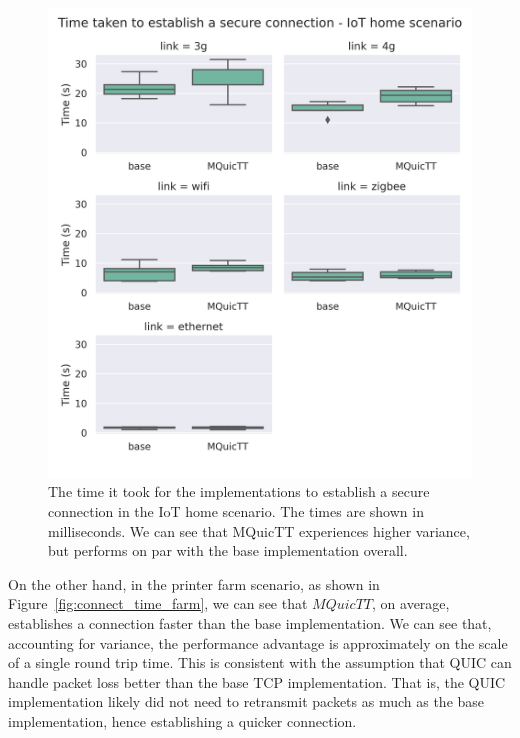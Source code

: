 \begin{figure}
    \centering
    \includegraphics[width=1\linewidth]{images/analysis_connection_time_home.png}
    \caption{The time it took for the implementations to establish a secure connection in the IoT home scenario.
        The times are shown in milliseconds.
        We can see that MQuicTT experiences higher variance, but performs on par with the base implementation overall.}
    \label{fig:connect_time_home}
\end{figure}


On the other hand, in the printer farm scenario, as shown in Figure~\ref{fig:connect_time_farm}, we can see that $MQuicTT$, on average, establishes a connection faster than the base implementation.
We can see that, accounting for variance, the performance advantage is approximately on the scale of a single round trip time.
This is consistent with the assumption that QUIC can handle packet loss better than the base TCP implementation.
That is, the QUIC implementation likely did not need to retransmit packets as much as the base implementation, hence establishing a quicker connection.

